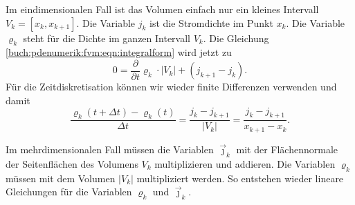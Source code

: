 Im eindimensionalen Fall ist das Volumen einfach nur ein kleines 
Intervall $V_k = [x_k,x_{k+1}]$.
Die Variable $j_k$ ist die Stromdichte im Punkt $x_k$.
Die Variable $\varrho_k$ steht für die Dichte im ganzen Intervall $V_k$.
Die Gleichung \eqref{buch:pdenumerik:fvm:eqn:integralform}
wird jetzt zu
\[
0
=
\frac{\partial}{\partial t}
\varrho_k\cdot|V_k|
+
(j_{k+1}-j_{k}).
\]
Für die Zeitdiskretisation können wir wieder finite Differenzen
verwenden und damit
\[
\frac{
\varrho_k(t+\Delta t)
-
\varrho_k(t)
}{
\Delta t
}
=
\frac{j_k-j_{k+1}}{|V_{k}|}
=
\frac{j_k-j_{k+1}}{x_{k+1}-x_k}.
\]

Im mehrdimensionalen Fall müssen die Variablen $\vec{\jmath}_k$ mit
der Flächennormale der Seitenflächen des Volumens $V_k$ multiplizieren
und addieren.
Die Variablen $\varrho_k$ müssen mit dem Volumen $|V_k|$ multipliziert
werden.
So entstehen wieder lineare Gleichungen für die Variablen $\varrho_k$
und $\vec{\jmath}_k$.




